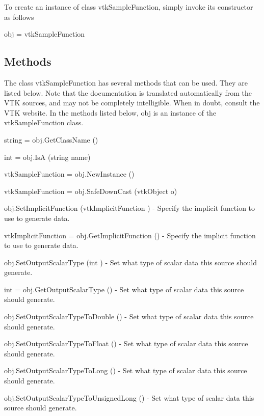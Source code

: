 To create an instance of class vtk\-Sample\-Function, simply invoke its constructor as follows \begin{DoxyVerb}  obj = vtkSampleFunction
\end{DoxyVerb}
 \hypertarget{vtkwidgets_vtkxyplotwidget_Methods}{}\subsection{Methods}\label{vtkwidgets_vtkxyplotwidget_Methods}
The class vtk\-Sample\-Function has several methods that can be used. They are listed below. Note that the documentation is translated automatically from the V\-T\-K sources, and may not be completely intelligible. When in doubt, consult the V\-T\-K website. In the methods listed below, {\ttfamily obj} is an instance of the vtk\-Sample\-Function class. 
\begin{DoxyItemize}
\item {\ttfamily string = obj.\-Get\-Class\-Name ()}  
\item {\ttfamily int = obj.\-Is\-A (string name)}  
\item {\ttfamily vtk\-Sample\-Function = obj.\-New\-Instance ()}  
\item {\ttfamily vtk\-Sample\-Function = obj.\-Safe\-Down\-Cast (vtk\-Object o)}  
\item {\ttfamily obj.\-Set\-Implicit\-Function (vtk\-Implicit\-Function )} -\/ Specify the implicit function to use to generate data.  
\item {\ttfamily vtk\-Implicit\-Function = obj.\-Get\-Implicit\-Function ()} -\/ Specify the implicit function to use to generate data.  
\item {\ttfamily obj.\-Set\-Output\-Scalar\-Type (int )} -\/ Set what type of scalar data this source should generate.  
\item {\ttfamily int = obj.\-Get\-Output\-Scalar\-Type ()} -\/ Set what type of scalar data this source should generate.  
\item {\ttfamily obj.\-Set\-Output\-Scalar\-Type\-To\-Double ()} -\/ Set what type of scalar data this source should generate.  
\item {\ttfamily obj.\-Set\-Output\-Scalar\-Type\-To\-Float ()} -\/ Set what type of scalar data this source should generate.  
\item {\ttfamily obj.\-Set\-Output\-Scalar\-Type\-To\-Long ()} -\/ Set what type of scalar data this source should generate.  
\item {\ttfamily obj.\-Set\-Output\-Scalar\-Type\-To\-Unsigned\-Long ()} -\/ Set what type of scalar data this source should generate.  

\end{DoxyItemize}
